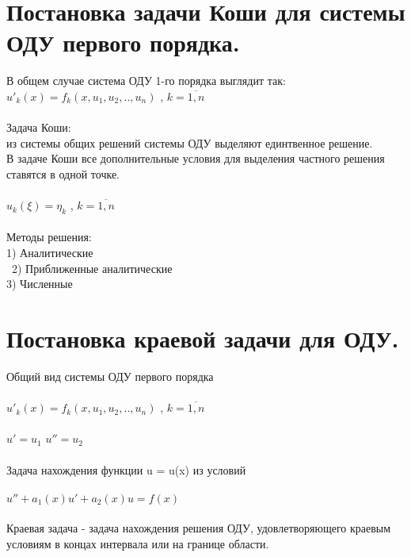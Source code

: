 \documentclass[12pt,a4paper]{article}
\begin{document}
	\section{Постановка задачи Коши для системы ОДУ первого порядка.}
	В общем случае 	система ОДУ 1-го порядка выглядит так:\\
	$u'_k(x) = f_k(x, u_1, u_2, .., u_n)$ , $k = \overline{1, n}$ \\\\
	Задача Коши: \\из системы общих решений системы ОДУ выделяют единтвенное решение.\\ В задаче Коши  все дополнительные условия для выделения частного решения ставятся в одной точке.\\\\
	$u_k(\xi) = \eta_k$ , $k = \overline{1, n}$\\\\
	Методы решения:\\
	1) Аналитические\\\
	2) Приближенные аналитические\\
	3) Численные\\
	\section{Постановка краевой задачи для ОДУ.}
	Общий вид системы ОДУ первого порядка\\\\
	$u'_k(x) = f_k(x, u_1, u_2, .., u_n)$ , $k = \overline{1, n}$ \\\\
	$u' = u_1$	$u'' =  u_2$\\\\
	Задача нахождения функции u = u(x) из условий \\\\
	$u''  + a_1(x)u' + a_2(x)u = f(x)$\\\\
	Краевая задача - задача нахождения решения ОДУ, удовлетворяющего краевым условиям в концах интервала или на границе области.
	
\end{document}
